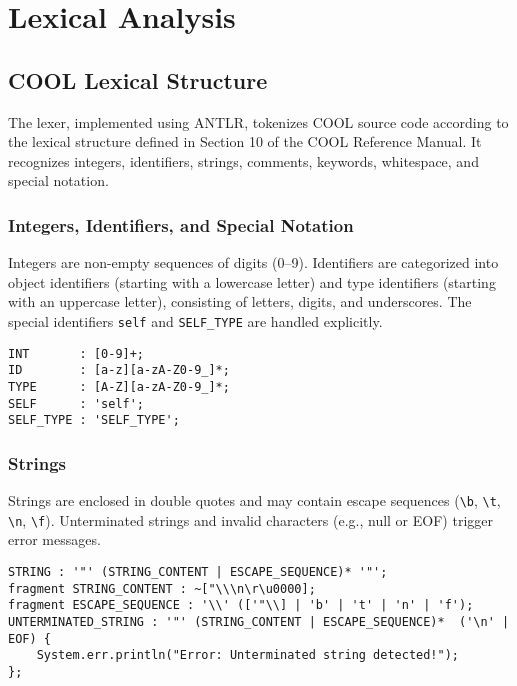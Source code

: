 \documentclass[titlepage]{article}
\begin{document}
\section{Lexical Analysis}

\subsection{COOL Lexical Structure}

The lexer, implemented using ANTLR, tokenizes COOL source code according to the lexical structure defined in Section 10 of the COOL Reference Manual. It recognizes integers, identifiers, strings, comments, keywords, whitespace, and special notation.

\subsubsection{Integers, Identifiers, and Special Notation}

Integers are non-empty sequences of digits (0--9). Identifiers are categorized into object identifiers (starting with a lowercase letter) and type identifiers (starting with an uppercase letter), consisting of letters, digits, and underscores. The special identifiers \texttt{self} and \texttt{SELF\_TYPE} are handled explicitly.

\begin{lstlisting}
INT       : [0-9]+;
ID        : [a-z][a-zA-Z0-9_]*;
TYPE      : [A-Z][a-zA-Z0-9_]*;
SELF      : 'self';
SELF_TYPE : 'SELF_TYPE';
\end{lstlisting}

\subsubsection{Strings}

Strings are enclosed in double quotes and may contain escape sequences (\texttt{\textbackslash b}, \texttt{\textbackslash t}, \texttt{\textbackslash n}, \texttt{\textbackslash f}). Unterminated strings and invalid characters (e.g., null or EOF) trigger error messages.

\begin{lstlisting}
STRING : '"' (STRING_CONTENT | ESCAPE_SEQUENCE)* '"';
fragment STRING_CONTENT : ~["\\\n\r\u0000];
fragment ESCAPE_SEQUENCE : '\\' (['"\\] | 'b' | 't' | 'n' | 'f');
UNTERMINATED_STRING : '"' (STRING_CONTENT | ESCAPE_SEQUENCE)*  ('\n' | EOF) { 
    System.err.println("Error: Unterminated string detected!"); 
};
\end{lstlisting}
\end{document}
